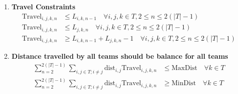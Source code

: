 \documentclass[a4paper, 12pt]{article}
\begin{document}
\begin{enumerate}
    \item \textbf{Travel Constraints}
    \begin{align*}
        \text{Travel}_{i,j,k,n} &\leq L_{i,k,n-1} \quad \forall i,j,k \in T ,2 \leq n \leq 2(|T| - 1)\\
        \text{Travel}_{i,j,k,n} &\leq L_{j,k,n} \quad \forall i,j,k \in T ,2 \leq n \leq 2(|T| - 1)\\
        \text{Travel}_{i,j,k,n} &\geq L_{i,k,n-1} + L_{j,k,n} - 1 \quad \forall i,j,k \in T ,2 \leq n \leq 2(|T| - 1)
    \end{align*}

    \item \textbf{Distance travelled by all teams should be balance for all teams}
    \begin{align*}
        \sum_{n = 2}^{2(|T| - 1)}\sum_{i,j \in T; i \neq j} \text{dist}_{i,j} \text{Travel}_{i,j,k,n} &\leq \text{MaxDist} \quad \forall k \in T \\
        \sum_{n = 2}^{2(|T|-1)}\sum_{i,j \in T; i \neq j} \text{dist}_{i,j} \text{Travel}_{i,j,k,n} &\geq \text{MinDist} \quad \forall k \in T
    \end{align*}

\end{enumerate}
\end{document}
